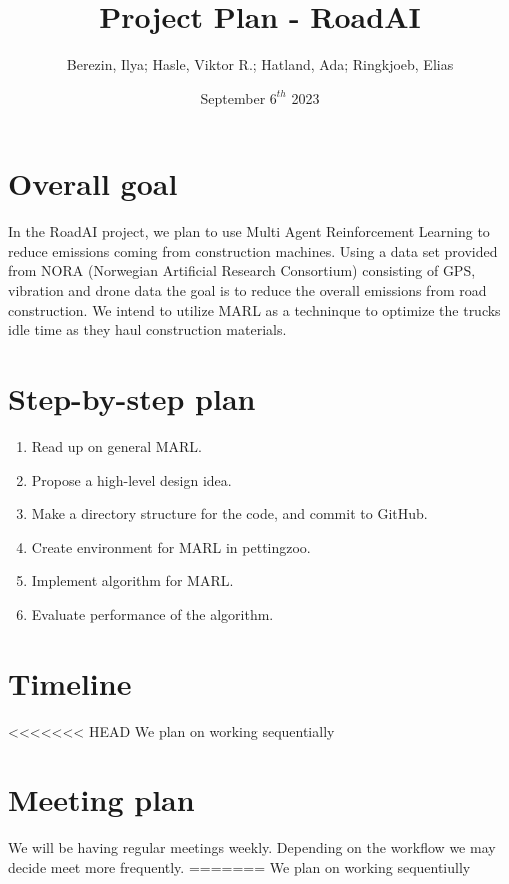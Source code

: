 \documentclass{article}
\title{Project Plan - RoadAI}
\author{Berezin, Ilya; Hasle, Viktor R.; Hatland, Ada; Ringkjoeb, Elias}
\date{September $6^{th}$ 2023}
\begin{document}
\begin{titlepage}
\maketitle
\tableofcontents
\end{titlepage}


\section{Overall goal}
In the RoadAI project, we plan to use Multi Agent Reinforcement Learning to reduce emissions coming from
construction machines. Using a data set provided from NORA (Norwegian Artificial Research Consortium) consisting of GPS, vibration and drone data 
the goal is to reduce the overall emissions from road construction. We intend to utilize MARL as a techninque to optimize 
the trucks idle time as they haul construction materials.

\section{Step-by-step plan}
\begin{enumerate}
  \item Read up on general MARL.\\
  \item Propose a high-level design idea.\\
  \item Make a directory structure for the code, and commit to GitHub.\\
  \item Create environment for MARL in pettingzoo.\\
  \item Implement algorithm for MARL. \\
  \item Evaluate performance of the algorithm.
\end{enumerate}

\section{Timeline}
<<<<<<< HEAD
We plan on working sequentially 
\section{Meeting plan}
We will be having regular meetings weekly. Depending on the workflow we may decide meet more frequently.
=======
We plan on working sequentiully 
\end{document}
